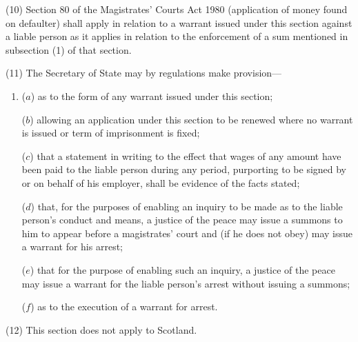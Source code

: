 \documentclass[12pt,a4paper]{article}
\begin{document}
(10) Section 80 of the Magistrates' Courts Act 1980 (application of money found on defaulter) shall apply in relation to a warrant issued under this section against a liable person as it applies in relation to the enforcement of a sum mentioned in subsection (1)  of that section.

(11) The Secretary of State may by regulations make provision—
\begin{enumerate}\item[]
($a$) as to the form of any warrant issued under this section;

($b$) allowing an application under this section to be renewed where no warrant is issued or term of imprisonment is fixed;

($c$) that a statement in writing to the effect that wages of any amount have been paid to the liable person during any period, purporting to be signed by or on behalf of his employer, shall be evidence of the facts stated;

($d$) that, for the purposes of enabling an inquiry to be made as to the liable person’s conduct and means, a justice of the peace may issue a summons to him to appear before a magistrates' court and (if he does not obey) may issue a warrant for his arrest;

($e$) that for the purpose of enabling such an inquiry, a justice of the peace may issue a warrant for the liable person’s arrest without issuing a summons;

($f$) as to the execution of a warrant for arrest.
\end{enumerate}

%
%

(12) This section does not apply to Scotland.

\end{document}
